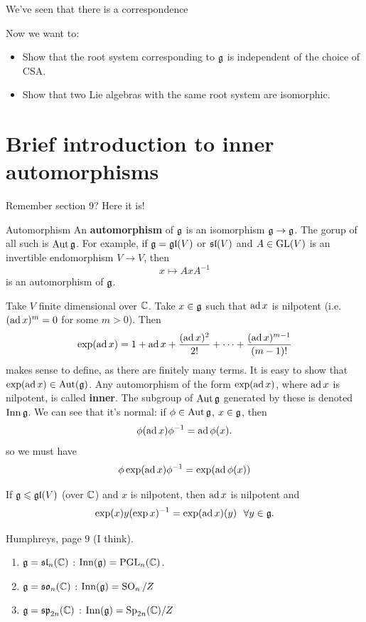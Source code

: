 \documentclass{article}
\begin{document}
We've \newlec seen that there is a correspondence 
\begin{center}
\end{center}
Now we \newlec want to: \begin{itemize}
    \item Show that the root system corresponding to $\mathfrak{g}$ is independent of the choice of CSA.
    \item Show that two Lie algebras with the same root system are isomorphic.
\end{itemize}
\setcounter{section}{8}
\section{Brief introduction to inner automorphisms}
Remember section 9? Here it is!
\begin{fancydefine*}{Automorphism}
    An \textbf{automorphism} of $\mathfrak{g}$ is an isomorphism $\mathfrak{g} \to \mathfrak{g}$. The gorup of all such is $\operatorname{Aut} \mathfrak{g}$. For example, if $\mathfrak{g} = \mathfrak{gl}(V)$ or $\mathfrak{sl}(V)$ and $A \in \operatorname{GL}(V)$ is an invertible endomorphism $V \to V$, then \[ x \mapsto AxA^{-1} \] is an automorphism of $\mathfrak{g}$.
\end{fancydefine*}
Take $V$ finite dimensional over $\mathbb{C}$. Take $x \in \mathfrak{g}$ such that $\operatorname{ad} x$ is nilpotent (i.e. $(\operatorname{ad} x)^{m}=0$ for some $m>0$). Then \[ \exp(\operatorname{ad} x) = 1 + \operatorname{ad} x + \frac{(\operatorname{ad} x)^{2}}{2!} + \cdots + \frac{(\operatorname{ad} x)^{m-1}}{(m-1)!}\]
makes sense to define, as there are finitely many terms. It is easy to show that $\exp(\operatorname{ad} x) \in \operatorname{Aut}(\mathfrak{g})$. Any automorphism of the form $\exp(\operatorname{ad} x)$, where $\operatorname{ad} x$ is nilpotent, is called \textbf{inner}. The subgroup of $\operatorname{Aut} \mathfrak{g}$ generated by these is denoted $\operatorname{Inn} \mathfrak{g}$. We can see that it's normal: if $\phi \in \operatorname{Aut} \mathfrak{g}$, $x \in \mathfrak{g}$, then \[ \phi(\operatorname{ad} x)\phi^{-1} = \operatorname{ad} \phi(x).\] so we must have \[ \phi \exp(\operatorname{ad} x) \phi^{-1} = \exp(\operatorname{ad} \phi(x))\]

\begin{fancylem}{}
    If $\mathfrak{g} \leqslant \mathfrak{gl}(V)$ (over $\mathbb{C}$) and $x$ is nilpotent, then $\operatorname{ad} x$ is nilpotent and \[ \exp(x)y(\exp x)^{-1} = \exp(\operatorname{ad} x)(y) \,\,\,\, \forall y \in \mathfrak{g}.\]
\end{fancylem}
\proof Humphreys, page $9$ (I think). \endproof
\begin{exs*}\hspace{0.1cm}
    \begin{enumerate}
        \item $\mathfrak{g} = \mathfrak{sl}_{n}(\mathbb{C})$ : $\operatorname{Inn}(\mathfrak{g}) = \operatorname{PGL}_{n}(\mathbb{C})$.
        \item $\mathfrak{g} = \mathfrak{so}_{n}(\mathbb{C})$ : $\operatorname{Inn}(\mathfrak{g}) = \operatorname{SO}_{n} / Z$
        \item $\mathfrak{g} = \mathfrak{sp}_{2n}(\mathbb{C})$ : $\operatorname{Inn}(\mathfrak{g}) = \operatorname{Sp}_{2n}(\mathbb{C}) / Z$
    \end{enumerate}
\end{exs*}
\setcounter{section}{14}
\end{document}
